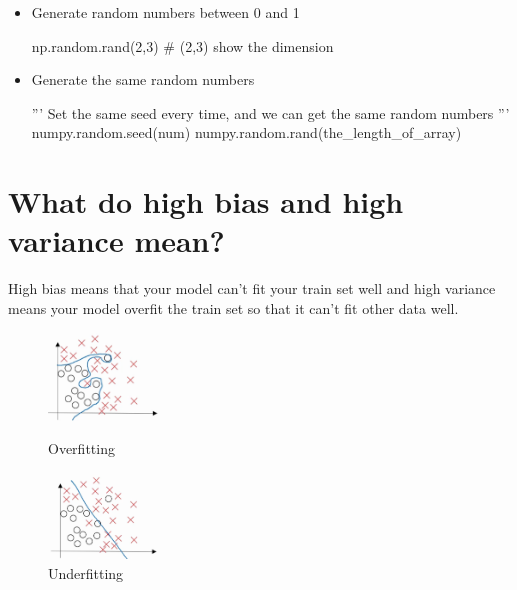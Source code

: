 \documentclass[10pt]{article}
\begin{document}
\begin{enumerate}
\begin{itemize}
\item Generate random numbers between 0 and 1
\begin{python}
np.random.rand(2,3) # (2,3) show the dimension
\end{python}

\item Generate the same random numbers
\begin{python}
'''
Set the same seed every time,
and we can get the same random numbers
'''
numpy.random.seed(num)
numpy.random.rand(the_length_of_array)
\end{python}

\end{itemize}


\end{enumerate} 

\section{What do high bias and high variance mean?}
\indent High bias means that your model can't fit your train set well and high variance means your model overfit the train set so that it can't fit other data well.

\begin{figure}[htbp]

\begin{minipage}[t]{0.45\linewidth}
\centering
\includegraphics[width=3cm]{overfit.png}
\caption{Overfitting}
\label{overfitting}
\end{minipage}
\hfill %
\begin{minipage}[t]{0.45\linewidth}
\centering
\includegraphics[width=3cm]{underfitting.png}
\caption{Underfitting}
\label{underfitting}
\end{minipage}
\end{figure}
\end{document}
